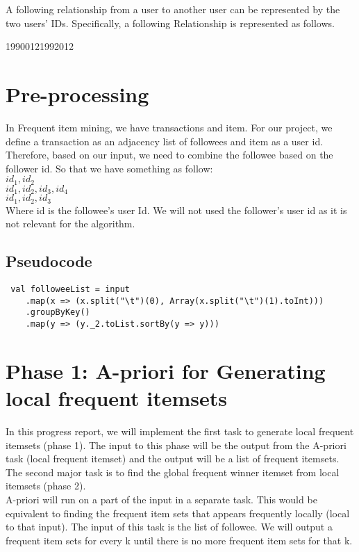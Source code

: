 \documentclass[11pt]{article}
\begin{document}
A following relationship from a user to another user can be represented by the two users' IDs.
Specifically, a following Relationship is represented as follows.

1990012\hspace{1cm}1992012 \\

\newpage
\section{Pre-processing}
In Frequent item mining, we have transactions and item.
For our project, we define a transaction as an adjacency list of followees and item as a user id.
Therefore, based on our input, we need to combine the followee based on the follower id.
So that we have something as follow: \\

$id_1, id_2$ \\
$id_1, id_2, id_3, id_4$ \\
$id_1, id_2, id_3$ \\

Where id is the followee's user Id.
We will not used the follower's user id as it is not relevant for the algorithm.

\subsection{Pseudocode}

\begin{lstlisting}
 val followeeList = input
    .map(x => (x.split("\t")(0), Array(x.split("\t")(1).toInt)))
    .groupByKey()
    .map(y => (y._2.toList.sortBy(y => y)))
\end{lstlisting}


\section{Phase 1: A-priori for Generating local frequent itemsets}
In this progress report, we will implement the first task to generate local frequent itemsets (phase 1).
The input to this phase will be the output from the A-priori task (local frequent itemset) and the output will be a list of frequent itemsets.
The second major task is to find the global frequent winner itemset from local itemsets (phase 2).\\
A-priori will run on a part of the input in a separate task.
This would be equivalent to finding the frequent item sets that appears frequently locally (local to that input).
The input of this task is the list of followee.
We will output a frequent item sets for every k until there is no more frequent item sets for that k.
\end{document}
